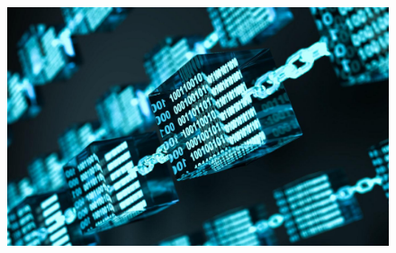 \documentclass[hyperref={colorlinks=true}]{beamer}
\begin{document}
\begin{frame}

\begin{center}

\begin{figure}
\includegraphics[width=\textwidth]{./assets/blockchain_revolution_technologie_cryptographie_280230556_Drupal.jpg}
\end{figure} 

\end{center}

\end{frame}
\end{document}
